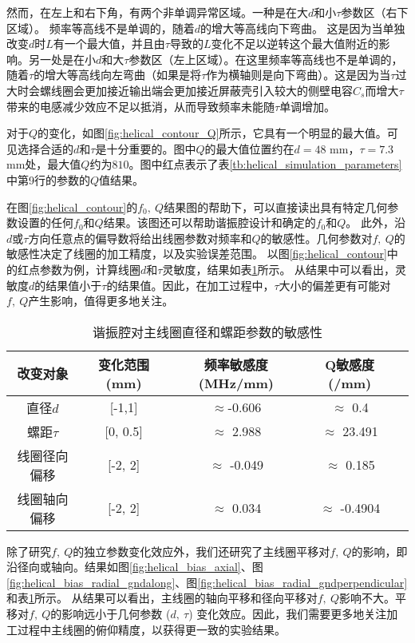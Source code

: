 然而，在左上和右下角，有两个非单调异常区域。一种是在大$d$和小$\tau$参数区（右下区域）。
频率等高线不是单调的，随着$d$的增大等高线向下弯曲。
这是因为当单独改变$d$时$L$有一个最大值，并且由$\tau$导致的$L$变化不足以逆转这个最大值附近的影响。另一处是在小$d$和大$\tau$参数区（左上区域）。在这里频率等高线也不是单调的，随着$\tau$的增大等高线向左弯曲（如果是将$\tau$作为横轴则是向下弯曲）。这是因为当$\tau$过大时会螺线圈会更加接近输出端会更加接近屏蔽壳引入较大的侧壁电容$C_s$而增大$\tau$带来的电感减少效应不足以抵消，从而导致频率未能随$\tau$单调增加。

对于$Q$的变化，如图\ref{fig:helical_contour_Q}所示，它具有一个明显的最大值。可见选择合适的$d$和$\tau$是十分重要的。图中$Q$的最大值位置约在$d=48$ mm，$\tau=7.3$ mm处，最大值$Q$约为$810$。图中红点表示了表\ref{tb:helical_simulation_parameters}中第9行的参数的$Q$值结果。

在图\ref{fig:helical_contour}的$ f_0,\ Q $结果图的帮助下，可以直接读出具有特定几何参数设置的任何$f_0$和$Q$结果。该图还可以帮助谐振腔设计和确定的$f_0$和$Q$。
此外，沿$d$或$\tau$方向任意点的偏导数将给出线圈参数对频率和$Q$的敏感性。几何参数对$f,\ Q$的敏感性决定了线圈的加工精度，以及实验误差范围。
以图\ref{fig:helical_contour}中的红点参数为例，计算线圈$d$和$\tau$灵敏度，结果如表\ref{tb:helical_d_tau_sensitivity}所示。
从结果中可以看出，灵敏度$d$的结果值小于$\tau$的结果值。因此，在加工过程中，$\tau$大小的偏差更有可能对 $f,\ Q$产生影响，值得更多地关注。

\begin{table}
    \centering
    \caption[谐振腔对主线圈直径和螺距参数的敏感性]{谐振腔对主线圈直径和螺距参数的敏感性\label{tb:helical_d_tau_sensitivity}}
    \begin{tabular}{ccccc}
        \toprule
        改变对象 & 变化范围 (mm) & 频率敏感度(MHz/mm) & Q敏感度(/mm) \\
        \midrule
        直径$d$  & [-1,1] & $\approx$-0.606 & $\approx$ 0.4\\
        螺距$\tau$  & [0, 0.5] & $\approx$ 2.988 & $\approx$ 23.491 \\
        线圈径向偏移 & [-2, 2] & $\approx$ -0.049 & $\approx$ 0.185\\
        线圈轴向偏移 & [-2, 2] & $\approx$ 0.034 & $\approx$ -0.4904\\
        \bottomrule
    \end{tabular}
\end{table}

除了研究$f,\ Q$的独立参数变化效应外，我们还研究了主线圈平移对$f,\ Q$的影响，即沿径向或轴向。结果如图\ref{fig:helical_bias_axial}、图\ref{fig:helical_bias_radial_gndalong}、图\ref{fig:helical_bias_radial_gndperpendicular}和表\ref{tb:helical_d_tau_sensitivity}所示。
从结果可以看出，主线圈的轴向平移和径向平移对$f,\ Q$影响不大。平移对$f,\ Q$的影响远小于几何参数 ($d,\ \tau$) 变化效应。因此，我们需要更多地关注加工过程中主线圈的俯仰精度，以获得更一致的实验结果。


